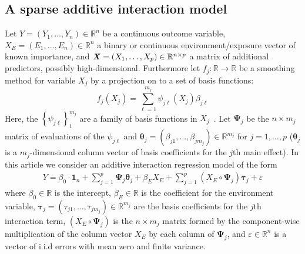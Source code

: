\documentclass[useAMS,usenatbib,referee]{biom}
\newcommand{\bX}{\textbf{\emph{X}}}
\newcommand{\btau}{\boldsymbol{\tau}}
\newcommand{\e}{{\mathsf E}}
\newcommand{\bmu}{\boldsymbol{\mu}}
\newcommand{\btheta}{\boldsymbol{\theta}}
\newcommand{\bPsi}{\boldsymbol{\Psi}}
\begin{document}
\subsection{A sparse additive interaction model}
Let $Y=(Y_1, \ldots, Y_n) \in \mathbb{R}^n$ be a continuous outcome variable, \mbox{$X_E=(E_1, \ldots, E_n) \in \mathbb{R}^n$} a binary or continuous environment/exposure vector of known importance, and \mbox{$\bX = (X_{1}, \ldots, X_{p}) \in \mathbb{R}^{n\times p}$} a matrix of additional predictors, possibly high-dimensional. Furthermore let $f_j: \mathbb{R} \rightarrow \mathbb{R}$ be a smoothing method for variable $X_j$ by a projection on to a set of basis functions:
\begin{equation}
f_j(X_j) = \sum_{\ell = 1}^{m_j} \psi_{j\ell}(X_j) \beta_{j\ell} \label{eq:smooth}
\end{equation}
Here, the $\left\lbrace \psi_{j\ell} \right\rbrace_1^{m_j}$ are a family of basis functions in $X_j$~\citep{hastie2015statistical}. Let $\bPsi_j$ be the $n \times m_j$ matrix of evaluations of the $\psi_{j\ell}$ and \mbox{$\btheta_j = (\beta_{j1}, \ldots, \beta_{jm_j}) \in \mathbb{R}^{m_j}$} for $j = 1, \ldots, p$ ($\btheta_j$ is a $m_j$-dimensional column vector of basis coefficients for the $j$th main effect). In this article we consider an additive interaction regression model of the form
\begin{align}
Y = \beta_0 \cdot \boldsymbol{1}_n + \sum_{j=1}^p \bPsi_j \btheta_j + \beta_E X_E + \sum_{j=1}^p (X_E \circ \bPsi_j) \btau_j + \varepsilon  \label{eq:linpred}
\end{align}
where $\beta_0 \in \mathbb{R}$ is the intercept, $\beta_E \in \mathbb{R}$ is the coefficient for the environment variable, $\btau_j = (\tau_{j1}, \ldots, \tau_{jm_j})\in \mathbb{R}^{m_j}$ are the basis coefficients for the $j$th interaction term, $(X_E \circ \bPsi_j)$ is the $n \times m_j$ matrix formed by the component-wise multiplication of the column vector $X_E$ by each column of $\bPsi_j$, and $\varepsilon \in \mathbb{R}^n$ is a vector of i.i.d errors with mean zero and finite variance. %
\end{document}
